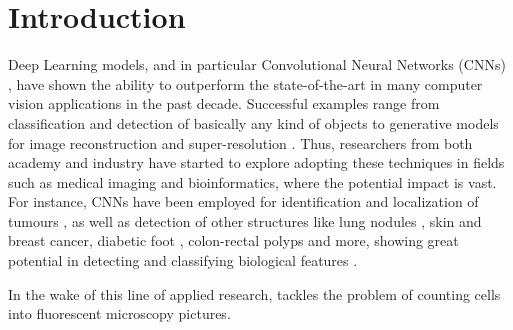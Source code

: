 \chapter{Introduction}
\label{chap:partI_intro}

Deep Learning models, and in particular Convolutional Neural Networks (CNNs) \cite{jimenez, greenspan}, have shown the ability to outperform the state-of-the-art in many computer vision applications in the past decade. 
Successful examples range from classification and detection of basically any kind of objects \cite{AlexNet, YOLO} to generative models for image reconstruction \cite{reconstruction} and super-resolution \cite{super-resolution}.
Thus, researchers from both academy and industry have started to explore adopting these techniques in fields such as medical imaging and bioinformatics, where the potential impact is vast.
For instance, CNNs have been employed for identification and localization of tumours \cite{brain_tumor,breast_cancer, ciresan2012deep, cirecsan2013mitosis}, as well as detection of other structures like lung nodules \cite{lung_nodules, meraj2020lung, su2021lung}, skin and breast cancer, diabetic foot \cite{TL_medical_imaging}, colon-rectal polyps \cite{korbar} and more, showing great potential in detecting and classifying biological features \cite{lundervold, sahiner, yadav}.

In the wake of this line of applied research,  tackles the problem of counting cells into fluorescent microscopy pictures.






